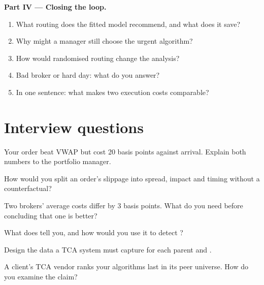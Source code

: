 \begin{problem}
\medskip\noindent\textbf{Part IV --- Closing the loop.}
\begin{enumerate}[resume]
\item What routing does the fitted model recommend, and what does it save?
\item Why might a manager still choose the urgent algorithm?
\item How would randomised routing change the analysis?
\item Bad broker or hard day: what do you answer?
\item In one sentence: what makes two execution costs comparable?
\end{enumerate}
\end{problem}

\section{Interview questions}

\begin{interviewq}\label{iq:mx:transaction-cost-analysis:1}
Your order beat VWAP but cost 20 basis points against arrival. Explain both numbers to the portfolio manager.
\end{interviewq}

\begin{interviewq}\label{iq:mx:transaction-cost-analysis:2}
How would you split an order's slippage into spread, impact and timing without a counterfactual?
\end{interviewq}

\begin{interviewq}\label{iq:mx:transaction-cost-analysis:3}
Two brokers' average costs differ by 3 basis points. What do you need before concluding that one is better?
\end{interviewq}

\begin{interviewq}\label{iq:mx:transaction-cost-analysis:4}
What does  tell you, and how would you use it to detect ?
\end{interviewq}

\begin{interviewq}\label{iq:mx:transaction-cost-analysis:5}
Design the data a TCA system must capture for each parent and .
\end{interviewq}

\begin{interviewq}\label{iq:mx:transaction-cost-analysis:6}
A client's TCA vendor ranks your algorithms last in its peer universe. How do you examine the claim?
\end{interviewq}

